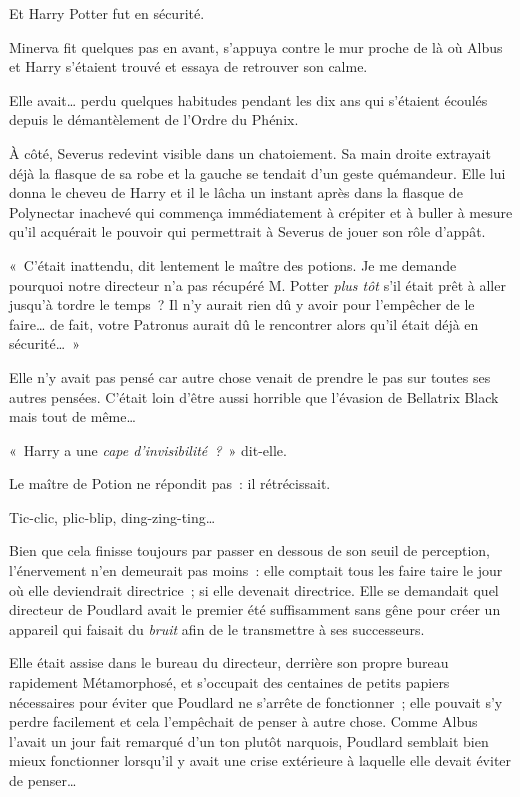 Et Harry Potter fut en sécurité.

Minerva fit quelques pas en avant, s'appuya contre le mur proche de là où Albus et Harry s'étaient trouvé et essaya de retrouver son calme.

Elle avait… perdu quelques habitudes pendant les dix ans qui s'étaient écoulés depuis le démantèlement de l'Ordre du Phénix.

À côté, Severus redevint visible dans un chatoiement. Sa main droite extrayait déjà la flasque de sa robe et la gauche se tendait d'un geste quémandeur. Elle lui donna le cheveu de Harry et il le lâcha un instant après dans la flasque de Polynectar inachevé qui commença immédiatement à crépiter et à buller à mesure qu'il acquérait le pouvoir qui permettrait à Severus de jouer son rôle d'appât.

«~C'était inattendu, dit lentement le maître des potions. Je me demande pourquoi notre directeur n'a pas récupéré M. Potter \emph{plus tôt} s'il était prêt à aller jusqu'à tordre le temps~? Il n'y aurait rien dû y avoir pour l'empêcher de le faire… de fait, votre Patronus aurait dû le rencontrer alors qu'il était déjà en sécurité…~»

Elle n'y avait pas pensé car autre chose venait de prendre le pas sur toutes ses autres pensées. C'était loin d'être aussi horrible que l'évasion de Bellatrix Black mais tout de même…

«~Harry a une \emph{cape d'invisibilité~?}~» dit-elle.

Le maître de Potion ne répondit pas~: il rétrécissait.

\later

Tic-clic, plic-blip, ding-zing-ting…

Bien que cela finisse toujours par passer en dessous de son seuil de perception, l'énervement n'en demeurait pas moins~: elle comptait tous les faire taire le jour où elle deviendrait directrice~; si elle devenait directrice. Elle se demandait quel directeur de Poudlard avait le premier été suffisamment sans gêne pour créer un appareil qui faisait du \emph{bruit} afin de le transmettre à ses successeurs.

Elle était assise dans le bureau du directeur, derrière son propre bureau rapidement Métamorphosé, et s'occupait des centaines de petits papiers nécessaires pour éviter que Poudlard ne s'arrête de fonctionner~; elle pouvait s'y perdre facilement et cela l'empêchait de penser à autre chose. Comme Albus l'avait un jour fait remarqué d'un ton plutôt narquois, Poudlard semblait bien mieux fonctionner lorsqu'il y avait une crise extérieure à laquelle elle devait éviter de penser…

